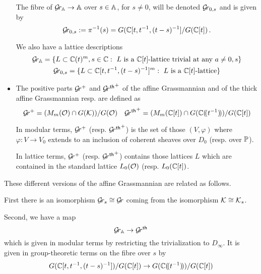 \documentclass[draft]{article}
\begin{document}
\begin{itemize}
    The fibre of $\Grbd \to \AA$ over $ s \in \AA $, for $ s \ne 0$, will be denoted $ \Gr_{0,s} $ and is given by
    $$ 
    \Gr_{0,s} := \pi^{-1}(s) = G(\CC[t, t^{-1}, (t-s)^{-1}]/G(\CC[t])\,.
    $$
    
    We also have a lattice descriptions 
    \begin{gather*}
    \Grbd = 
    \{ L \subset  \CC(t)^m, s \in \CC : \text{ $L$ is a $\CC[t]$-lattice 
    trivial at any $ a \ne 0, s$} \} \\
     \Gr_{0,s} = 
    \{ L \subset  \CC[t,t^{-1},(t-s)^{-1}]^m : \text{ $L$ is a $\CC[t]$-lattice} \}
    \end{gather*}%
    \item The positive parts $ \Gr^+$ and ${\Grth}^+$ of the affine Grassmannian and of the thick affine Grassmannian resp. are defined as 
    $$
    \Gr^+ = (M_m(\cO) \cap G(\cK)) / G(\cO) \quad {\Grth}^+ = (M_m(\CC[t]) \cap G(\CC\xT[t^{-1}]) / G(\CC[t]) 
    $$

    In modular terms, $\Gr^+$ (resp. ${\Grth}^+$) is the set of those $ (V, \varphi)$ where $ \varphi : V \rightarrow V_0 $ extends to an inclusion of coherent sheaves over $ D_0 $ (resp. over $ \PP$).  
    
    In lattice terms, $ \Gr^+$ (resp. ${\Grth}^+$) contains those lattices $L$ which are contained in the standard  lattice $ L_0(\cO)$ (resp. $L_0(\CC[t])$. %
\end{itemize}

These  different versions of the affine Grassmannian are related as follows.  

First there is an isomorphism $ \Gr_s \cong \Gr $ coming from the isomorphism $ \cK \cong \Ks$.

Second, we have a map $$ \Grbd \rightarrow \Grth $$ which is given in modular terms by restricting the trivialization to $ D_\infty$.  It is given in group-theoretic terms on the fibre over $ s $ by
$$
G(\CC[t, t^{-1}, (t-s)^{-1}])/ G(\CC[t]) \rightarrow G(\CC\xT[t^{-1}])/G(\CC[t])
$$
\end{document}
